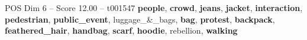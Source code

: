 \begin{textsample}{POS Dim 6 – Score 12.00 – t001547}  \label{ex:f6_pos_031}
\textbf{people}, \textbf{crowd}, \textbf{jeans}, \textbf{jacket}, \textbf{interaction}, \textbf{pedestrian}, \textbf{public\_event}, luggage\_\&\_bags, \textbf{bag}, \textbf{protest}, \textbf{backpack}, \textbf{feathered\_hair}, \textbf{handbag}, \textbf{scarf}, \textbf{hoodie}, rebellion, \textbf{walking}

\end{textsample}
